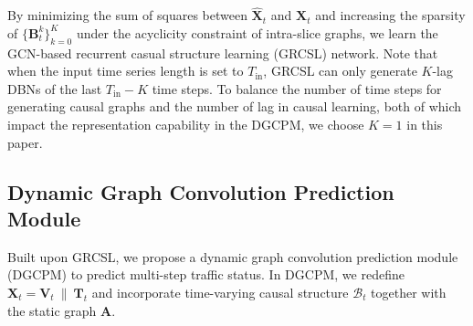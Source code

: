 \documentclass[letterpaper, 10 pt, conference]{ieeeconf}
\begin{document}
By minimizing the sum of squares between $\hat{\mathbf{X}}_t$ and $\mathbf{X}_t$ and increasing the sparsity of $\{\mathbf{B}_t^k\}_{k=0}^K$ under the acyclicity constraint of intra-slice graphs, we learn the GCN-based recurrent casual structure learning (GRCSL) network. Note that when the input time series length is set to $T_{\text{in}}$, GRCSL can only generate $K$-lag DBNs of the last $T_{\text{in}}-K$ time steps. To balance the number of time steps for generating causal graphs and the number of lag in causal learning, both of which impact the representation capability in the DGCPM, we choose $K=1$ in this paper.



\subsection{Dynamic Graph Convolution Prediction Module}
Built upon GRCSL, we propose a dynamic graph convolution prediction module (DGCPM) to predict multi-step traffic status. In DGCPM, we redefine $\mathbf{X}_t=\mathbf{V}_t\ \|\ \mathbf{T}_t$ and incorporate time-varying causal structure $\mathcal{B}_{t}$ together with the static graph $\mathbf{A}$. 
\end{document}
